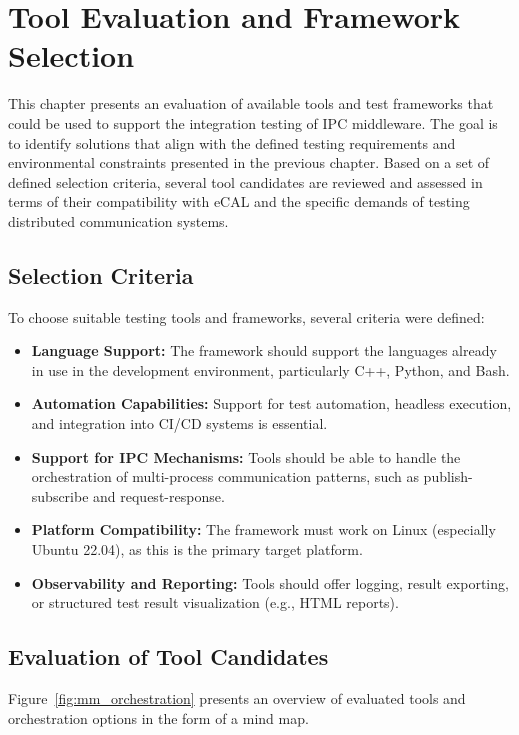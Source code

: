 \clearpage
\section{Tool Evaluation and Framework Selection}

This chapter presents an evaluation of available tools and test frameworks that could be used to support the integration testing of IPC middleware. The goal is to identify solutions that align with the defined testing requirements and environmental constraints presented in the previous chapter. Based on a set of defined selection criteria, several tool candidates are reviewed and assessed in terms of their compatibility with eCAL and the specific demands of testing distributed communication systems.

\subsection{Selection Criteria}

To choose suitable testing tools and frameworks, several criteria were defined:

\begin{itemize}
	\item \textbf{Language Support:} The framework should support the languages already in use in the development environment, particularly C++, Python, and Bash.
	\item \textbf{Automation Capabilities:} Support for test automation, headless execution, and integration into CI/CD systems is essential.
	\item \textbf{Support for IPC Mechanisms:} Tools should be able to handle the orchestration of multi-process communication patterns, such as publish-subscribe and request-response.
	\item \textbf{Platform Compatibility:} The framework must work on Linux (especially Ubuntu 22.04), as this is the primary target platform.
	\item \textbf{Observability and Reporting:} Tools should offer logging, result exporting, or structured test result visualization (e.g., HTML reports).
\end{itemize}

\subsection{Evaluation of Tool Candidates}

Figure~\ref{fig:mm_orchestration} presents an overview of evaluated tools and orchestration options in the form of a mind map.

